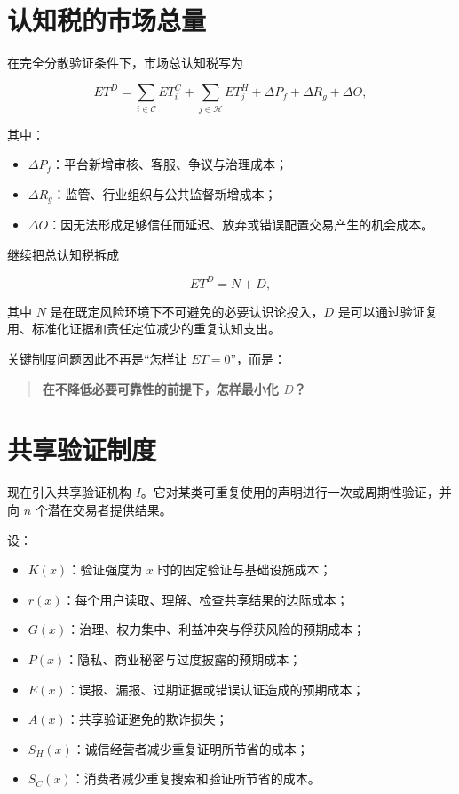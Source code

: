 \documentclass[UTF8,12pt]{ctexart}
\begin{document}
\section{认知税的市场总量}

在完全分散验证条件下，市场总认知税写为

\[
ET^{D}
=\sum_{i\in\mathcal{C}}ET_i^C
+\sum_{j\in\mathcal{H}}ET_j^H
+\Delta P_f+\Delta R_g+\Delta O,
\]

其中：

\begin{itemize}[leftmargin=2.2em]
  \item $\Delta P_f$：平台新增审核、客服、争议与治理成本；
  \item $\Delta R_g$：监管、行业组织与公共监督新增成本；
  \item $\Delta O$：因无法形成足够信任而延迟、放弃或错误配置交易产生的机会成本。
\end{itemize}

继续把总认知税拆成

\[
ET^D=N+D,
\]

其中 $N$ 是在既定风险环境下不可避免的必要认识论投入，$D$ 是可以通过验证复用、标准化证据和责任定位减少的重复认知支出。

关键制度问题因此不再是“怎样让 $ET=0$”，而是：

\begin{quote}
\textbf{在不降低必要可靠性的前提下，怎样最小化 $D$？}
\end{quote}

\section{共享验证制度}

现在引入共享验证机构 $I$。它对某类可重复使用的声明进行一次或周期性验证，并向 $n$ 个潜在交易者提供结果。

设：

\begin{itemize}[leftmargin=2.2em]
  \item $K(x)$：验证强度为 $x$ 时的固定验证与基础设施成本；
  \item $r(x)$：每个用户读取、理解、检查共享结果的边际成本；
  \item $G(x)$：治理、权力集中、利益冲突与俘获风险的预期成本；
  \item $P(x)$：隐私、商业秘密与过度披露的预期成本；
  \item $E(x)$：误报、漏报、过期证据或错误认证造成的预期成本；
  \item $A(x)$：共享验证避免的欺诈损失；
  \item $S_H(x)$：诚信经营者减少重复证明所节省的成本；
  \item $S_C(x)$：消费者减少重复搜索和验证所节省的成本。
\end{itemize}
\end{document}
